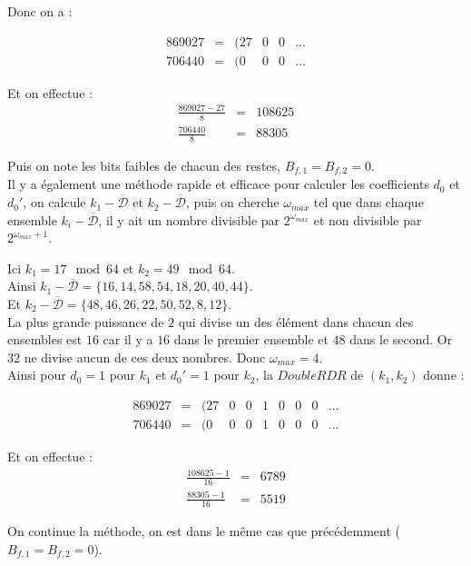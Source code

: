 \documentclass[12pt, a4paper]{memoir}
\newcommand{\dbarre}{\overline{\mathcal{D}}}
\begin{document}
 
 Donc on a :
 
 $$\begin{array}{cccccc}
  869027 & = & (27 & 0 & 0 & \ldots \\
  706440 & = & (0 & 0 & 0 & \ldots
 \end{array}$$
 
 Et on effectue :
 $$\begin{array}{cccccc}
  \frac{869027 - 27}{8} & = & 108625 \\
  \frac{706440}{8} & = & 88305
 \end{array}$$
 
Puis on note les bits faibles de chacun des restes, $B_{f,1} = B_{f,2} = 0$. \\
Il y a également une méthode rapide et efficace pour calculer les coefficients $d_0$ et $d_0'$, on calcule
$k_1 - \dbarre$ et $k_2 - \dbarre$, puis on cherche $\omega_{max}$ tel que dans chaque ensemble $k_i - \dbarre$, 
il y ait un nombre divisible par $2^{\omega_{max}}$ et non divisible par $2^{\omega_{max}+1}$.

Ici $k_1 = 17 \mod 64$ et $k_2 = 49 \mod 64$. \\
Ainsi  $k_1 - \dbarre = \{16,14,58,54,18,20,40,44\}$. \\
Et  $k_2 - \dbarre = \{48,46,26,22,50,52,8,12\}$. \\ 
La plus grande puissance de $2$ qui divise un des élément dans chacun des ensembles est $16$
car il y a $16$ dans le premier ensemble et $48$ dans le second. Or $32$ ne divise aucun de ces deux nombres. 
Donc $\omega_{max} = 4$. \\
Ainsi pour $d_0 = 1$ pour $k_1$ et $d_0' = 1$ pour $k_2$, la $DoubleRDR$ de $(k_1,k_2)$ donne :

 $$\begin{array}{cccccccccc}
  869027 & = & (27 & 0 & 0 & 1 & 0 & 0 & 0 & \ldots \\
  706440 & = & (0 & 0 & 0 & 1 & 0 & 0 & 0 & \ldots
 \end{array}$$
 
 Et on effectue :
 $$\begin{array}{cccccc}
  \frac{108625 - 1}{16} & = & 6789 \\
  \frac{88305-1}{16} & = & 5519
 \end{array}$$
 
 On continue la méthode, on est dans le même cas que précédemment ($B_{f,1} = B_{f,2} = 0$).
 
\end{document}
